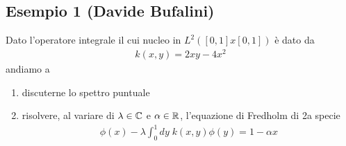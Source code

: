 \newpage



\subsection{Esempio 1 (Davide Bufalini)}

Dato l'operatore integrale il cui nucleo in $L^2([0,1]x[0,1])$ è dato da
\begin{align}
	k(x,y) = 2xy-4x^2 \label{nucleo}
\end{align}
andiamo a
\begin{enumerate}
	\item discuterne lo spettro puntuale
	\item risolvere, al variare di $\lambda \in \mathbb{C}$ e $\alpha \in \mathbb{R}$, l'equazione di Fredholm di 2a specie
	\begin{align}
		\phi(x) -\lambda \int_{0}^{1} dy \; k(x,y) \phi(y) = 1 -\alpha x
	\end{align} 
\end{enumerate}

